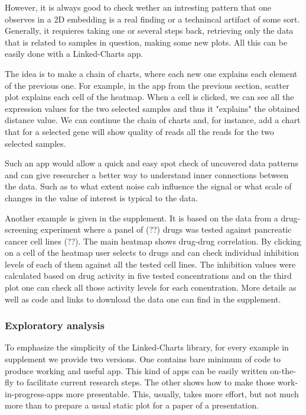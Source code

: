 \documentclass[twocolumn,10pt]{article}
\begin{document}
However, it is always good to check wether an intresting pattern that one observes in a 2D embedding is a real finding or a technincal artifact of some sort. Generally, it requieres taking one or several steps back, retrieving only the data that is related to samples in question, making some new plots. All this can be easily done with a Linked-Charts app.

The idea is to make a chain of charts, where each new one explains each element of the previous one. For example, in the app from the previous section, scatter plot explains each cell of the heatmap. When a cell is clicked, we can see all the expression values for the two selected samples and thus it "explains" the obtained distance value. We can continue the chain of charts and, for instance, add a chart that for a selected gene will show quality of reads all the reads for the two selected samples.

Such an app would allow a quick and easy spot check of uncovered data patterns and can give researcher a better way to understand inner connections between the data. Such as to what extent noise cab influence the signal or what scale of changes in the value of interest is typical to the data.

Another example is given in the supplement. It is based on the data from a drug-screening experiment where a panel of (??) drugs was tested against pancreatic cancer cell lines (??). The main heatmap shows drug-drug correlation. By clicking on a cell of the heatmap user selects to drugs and can check individual inhibition levels of each of them against all the tested cell lines. The inhibition values were calculated based on drug activity in five tested concentrations and on the third plot one can check all those activity levels for each conentration. More details as well as code and links to download the data one can find in the supplement.

\subsubsection{Exploratory analysis}
To emphasize the simplicity of the Linked-Charts library, for every example in supplement we provide two versions. One contains bare minimum of code to produce working and useful app. This kind of apps can be easily written on-the-fly to facilitate current research steps. The other shows how to make those work-in-progress-apps more presentable. This, usually, takes more effort, but not much more than to prepare a usual static plot for a paper of a presentation.
\end{document}
